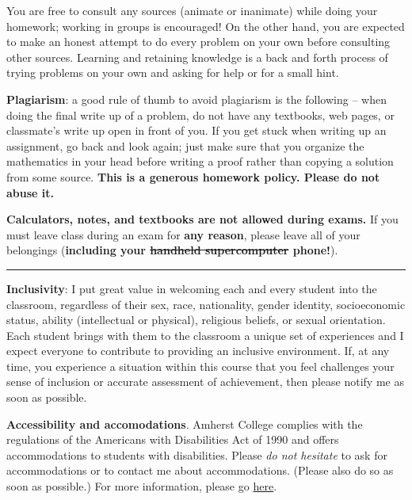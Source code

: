 \documentclass[12pt]{article}
\begin{document}
You are free to consult any sources (animate or inanimate) while doing your homework; working in groups is encouraged! %
On the other hand, you are expected to make an honest attempt to do every problem on your own before consulting other sources. Learning and retaining knowledge is a back and forth process of trying problems on your own and asking for help or for a small hint.

\bigskip
\noindent\textbf{Plagiarism}: a good rule of thumb to avoid plagiarism is the following -- when doing the final write up of a problem, do not have any textbooks, web pages, or classmate's write up open in front of you. If you get stuck when writing up an assignment, go back and look again; just make sure that you organize the mathematics in your head before writing a proof rather than copying a solution from some source. \textbf{This is a generous homework policy. Please do not abuse it.}

\bigskip
\noindent \textbf{Calculators, notes, and textbooks are not allowed during exams.}
 If you must leave class during an exam for \textbf{any reason}, please leave all of your belongings (\textbf{including your \sout{handheld supercomputer} phone!}).

\medskip \hrule \medskip

\noindent\textbf{Inclusivity}: I put great value in welcoming each and every student into the classroom, regardless of their
sex, race, nationality, gender identity, socioeconomic status, ability (intellectual or physical), religious beliefs, or sexual orientation. Each student brings with them to the classroom a unique set of experiences and I expect everyone to contribute to providing an inclusive environment. If, at any time, you experience a situation within this course that you feel challenges your sense of inclusion or accurate assessment of achievement, then please notify me as soon as possible.

\bigskip

\noindent\textbf{Accessibility and accomodations}.
Amherst College complies with the regulations of the Americans with Disabilities Act of 1990 and offers accommodations to students with disabilities. Please \emph{do not hesitate} to ask for accommodations or to contact me about accommodations. (Please also do so as soon as possible.) For more information, please go \href{https://www.amherst.edu/offices/student-affairs/accessibility-services}{here}.
\end{document}
